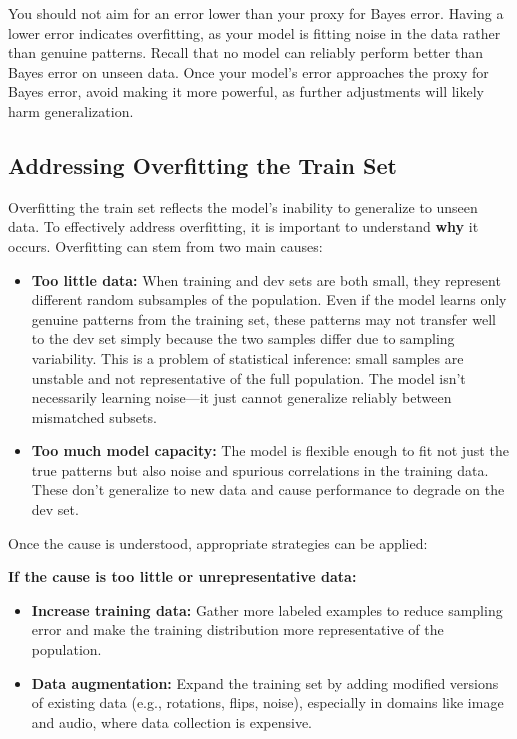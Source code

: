 \documentclass[12pt,openany]{book}
\begin{document}
\begin{notebox}
You should not aim for an error lower than your proxy for Bayes error. Having a lower error indicates overfitting, as your model is fitting noise in the data rather than genuine patterns. Recall that no model can reliably perform better than Bayes error on unseen data. Once your model’s error approaches the proxy for Bayes error, avoid making it more powerful, as further adjustments will likely harm generalization.
\end{notebox}


\subsection{Addressing Overfitting the Train Set} \label{sec:addressing_variance}

Overfitting the train set reflects the model’s inability to generalize to unseen data. To effectively address overfitting, it is important to understand \textbf{why} it occurs. Overfitting can stem from two main causes:

\begin{itemize}
    \item \textbf{Too little data:} When training and dev sets are both small, they represent different random subsamples of the population. Even if the model learns only genuine patterns from the training set, these patterns may not transfer well to the dev set simply because the two samples differ due to sampling variability. This is a problem of statistical inference: small samples are unstable and not representative of the full population. The model isn't necessarily learning noise—it just cannot generalize reliably between mismatched subsets.
    
    \item \textbf{Too much model capacity:} The model is flexible enough to fit not just the true patterns but also noise and spurious correlations in the training data. These don’t generalize to new data and cause performance to degrade on the dev set.
\end{itemize}

Once the cause is understood, appropriate strategies can be applied:

\textbf{If the cause is too little or unrepresentative data:}
\begin{itemize}
    \item \textbf{Increase training data:} Gather more labeled examples to reduce sampling error and make the training distribution more representative of the population.
    \item \textbf{Data augmentation:} Expand the training set by adding modified versions of existing data (e.g., rotations, flips, noise), especially in domains like image and audio, where data collection is expensive.
\end{itemize}
\end{document}
